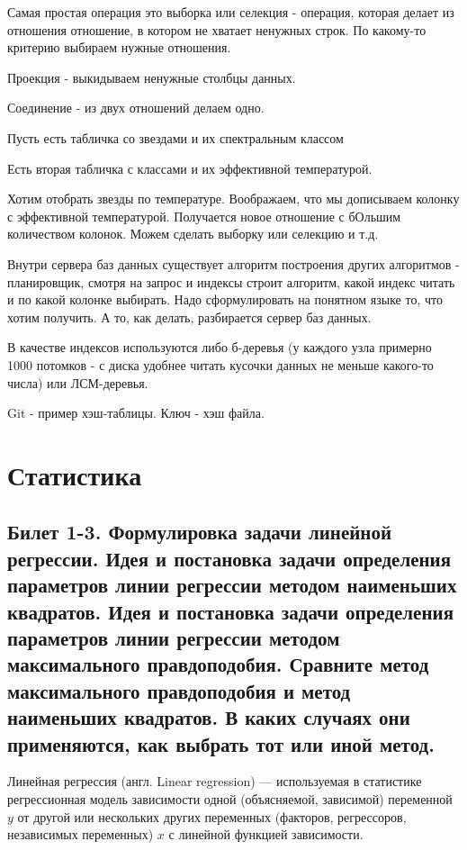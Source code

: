 \documentclass[a4paper, 12pt]{article}
\begin{document}
	Самая простая операция это выборка или селекция - операция, которая делает из отношения отношение, в котором не хватает ненужных строк. По какому-то критерию выбираем нужные отношения. 
	
	Проекция - выкидываем ненужные столбцы данных. 
	
	Соединение - из двух отношений делаем одно.
	
	Пусть есть табличка со звездами и их спектральным классом
	
	Есть вторая табличка с классами и их эффективной температурой.
	
	Хотим отобрать звезды по температуре. Воображаем, что мы дописываем колонку с эффективной температурой. Получается новое отношение с бОльшим количеством колонок. Можем сделать выборку или селекцию и т.д.
	
	Внутри сервера баз данных существует алгоритм построения других алгоритмов - планировщик, смотря на запрос и индексы строит алгоритм, какой индекс читать и по какой колонке выбирать. Надо сформулировать на понятном языке то, что хотим получить. А то, как делать, разбирается сервер баз данных. 
	
	В качестве индексов используются либо б-деревья (у каждого узла примерно 1000 потомков - с диска удобнее читать кусочки данных не меньше какого-то числа) или ЛСМ-деревья. 
	
	Git - пример хэш-таблицы. Ключ - хэш файла.
	\section*{Статистика}
	\subsection*{Билет 1-3. Формулировка задачи линейной регрессии. Идея и постановка задачи определения параметров линии регрессии методом наименьших квадратов. Идея и постановка задачи определения параметров линии регрессии методом максимального правдоподобия. Сравните метод максимального правдоподобия и метод наименьших квадратов. В каких случаях они применяются, как выбрать тот или иной метод.}
	Линейная регрессия (англ. Linear regression) — используемая в статистике регрессионная модель зависимости одной (объясняемой, зависимой) переменной $y$ от другой или нескольких других переменных (факторов, регрессоров, независимых переменных) $x$ с линейной функцией зависимости.
	
\end{document}
